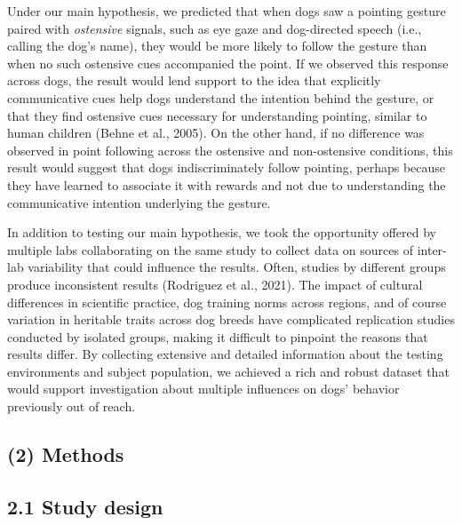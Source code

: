 \documentclass[
  man,floatsintext]{apa6}
\begin{document}
Under our main hypothesis, we predicted that when dogs saw a pointing gesture paired with \emph{ostensive} signals, such as eye gaze and dog-directed speech (i.e., calling the dog's name), they would be more likely to follow the gesture than when no such ostensive cues accompanied the point. If we observed this response across dogs, the result would lend support to the idea that explicitly communicative cues help dogs understand the intention behind the gesture, or that they find ostensive cues necessary for understanding pointing, similar to human children (Behne et al., 2005). On the other hand, if no difference was observed in point following across the ostensive and non-ostensive conditions, this result would suggest that dogs indiscriminately follow pointing, perhaps because they have learned to associate it with rewards and not due to understanding the communicative intention underlying the gesture.

In addition to testing our main hypothesis, we took the opportunity offered by multiple labs collaborating on the same study to collect data on sources of inter-lab variability that could influence the results. Often, studies by different groups produce inconsistent results (Rodriguez et al., 2021). The impact of cultural differences in scientific practice, dog training norms across regions, and of course variation in heritable traits across dog breeds have complicated replication studies conducted by isolated groups, making it difficult to pinpoint the reasons that results differ. By collecting extensive and detailed information about the testing environments and subject population, we achieved a rich and robust dataset that would support investigation about multiple influences on dogs' behavior previously out of reach.

\hypertarget{methods}{%
\subsection{(2) Methods}\label{methods}}

\hypertarget{study-design}{%
\subsection{2.1 Study design}\label{study-design}}
\end{document}

